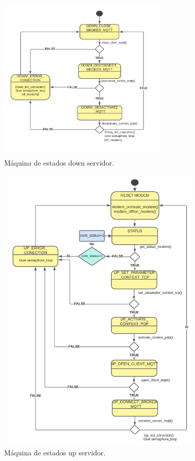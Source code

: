 \begin{figure}[h]
  \centering
  \includegraphics[width=8cm, height=8cm]{./Figures/SM down server.png}
  \caption{Máquina de estados down servidor.}
  \label{fig:Maquina de estados dowm servidor}
\end{figure}
\clearpage
\hspace{0.5cm}

\begin{figure}[t!]
  \centering
	\includegraphics[width=10cm, height=14cm]{./Figures/SM up server.png}
	\caption{Máquina de estados up servidor.}
	\label{fig:Maquina de estados up servidor}
\end{figure}

